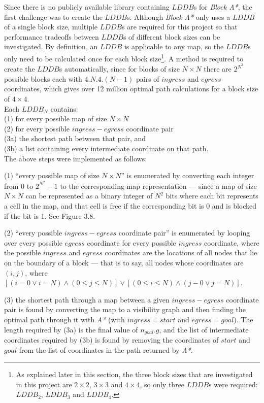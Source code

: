 \documentclass[12pt,notitlepage]{report}
\begin{document}
\noindent
Since there is no publicly available library containing $LDDB$s for {\em Block A*}, the first challenge was to create the $LDDB$s. Although {\em Block A*} only uses a $LDDB$ of a single block size, multiple $LDDB$s are required for this project so that performance tradeoffs between $LDDB$s of different block sizes can be investigated. By definition, an $LDDB$ is applicable to any map, so the $LDDB$s only need to be calculated once for each block size\footnote{As explained later in this section, the three block sizes that are investigated in this project are $2 \times 2$, $3 \times 3$ and $4 \times 4$, so only three $LDDB$s were required: $LDDB_{2}$, $LDDB_{3}$ and $LDDB_{4}$.}. A method is required to create the $LDDB$s automatically, since for blocks of size {$N \times N$} there are $2^{N^{2}}$ possible blocks each with $4.N.4.(N-1)$ pairs of $ingress$ and $egress$ coordinates, which gives over 12 million optimal path calculations for a block size of $4 \times 4$.\\

\noindent
Each $LDDB_{N}$ contains:\\
(1) \indent for every possible map of size $N \times N$\\
(2) \indent \indent for every possible $ingress-egress$ coordinate pair\\
(3a) \indent \indent \indent the shortest path between that pair, and\\
(3b) \indent \indent \indent a list containing every intermediate coordinate on that path.\\

\noindent
The above steps were implemented as follows:
\begin{description}
\item (1) ``every possible map of size $N \times N$'' is enumerated by converting each integer from $0$ to $2^{N^{2}}-1$ to the corresponding map representation --- since a map of size $N \times N$ can be represented as a binary integer of $N^{2}$ bits where each bit represents a cell in the map, and that cell is free if the corresponding bit is 0 and is blocked if the bit is 1. See Figure 3.8.
\item (2) ``every possible $ingress-egress$ coordinate pair'' is enumerated by looping over every possible $egress$ coordinate for every possible $ingress$ coordinate, where the possible $ingress$ and $egress$ coordinates are the locations of all nodes that lie on the boundary of a block --- that is to say, all nodes whose coordinates are $(i,j)$, where $[(i=0 \lor i=N) \land (0\leq j \leq N)] \lor [(0\leq i \leq N) \land (j-0 \lor j=N)]$.
\item (3) the shortest path through a map between a given $ingress-egress$ coordinate pair is found by converting the map to a visibility graph and then finding the optimal path through it with {\em A*} (with $ingress = start$ and $egress=goal$). The length required by (3a) is the final value of $n_{goal}.g$, and the list of intermediate coordinates required by (3b) is found by removing the coordinates of $start$ and $goal$ from the list of coordinates in the path returned by {\em A*}.
\end{description}
\end{document}
